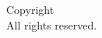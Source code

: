 

\thispagestyle{empty}
\begingroup
\small
\parindent 0pt
\parskip \baselineskip
	\null
  \vfill
\ifx\myName\@empty\else
\noindent
Copyright \textcopyright{} \the\year~\myName\\
All rights reserved.

	  \vfill



\vfill



